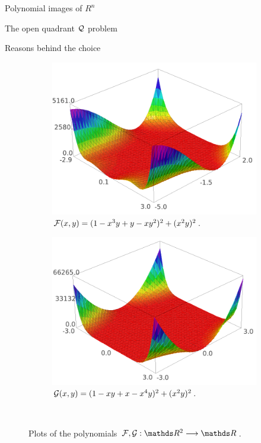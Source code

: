 \documentclass[11pt, a4paper, english, twoside, notitlepage]{report}
\begin{document}
\begin{chapter}{Polynomial images of $R^n$}
\begin{section}{The open quadrant $\mathcal{Q}$ problem}
\begin{subsection}{Reasons behind the choice}
		\begin{figure}[h]\hspace{-0.5cm}
			\begin{subfigure}{.54\linewidth}\centering
				\includegraphics[width=1\textwidth]{plots/ch1_04_F.png}
				\caption{$\mathcal{F}(x, y) = (1 - x^3 y + y - x y^2)^2 + (x^2 y)^2$.\label{fig:F}}
			\end{subfigure}
			\begin{subfigure}{.55\linewidth}\centering
				\includegraphics[width=1\textwidth]{plots/ch1_05_G.png}
				\caption{$\mathcal{G}(x, y) = (1 - xy + x - x^4 y)^2 + (x^2 y)^2$.\label{fig:G}}
			\end{subfigure}\\[1ex]
			\caption{Plots of the polynomials $\F, \G: \R^2 \longrightarrow \R$.\label{fig:plotFG}}
		\end{figure}
		

\end{subsection}
\end{section}
\end{chapter}
\end{document}
